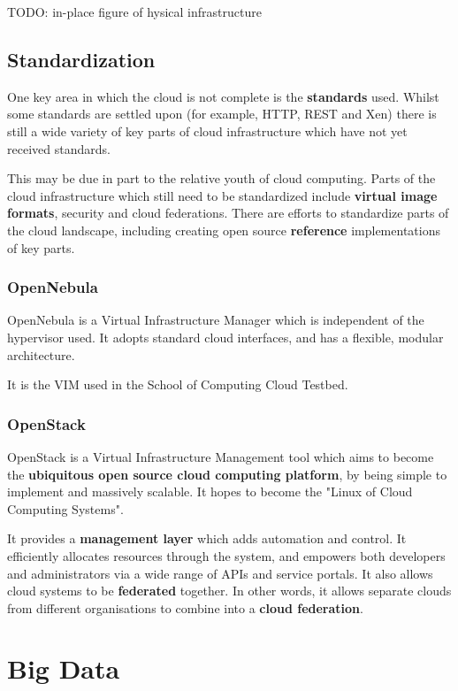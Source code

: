\documentclass{article}
\begin{document}
TODO: in-place figure of hysical infrastructure

\subsection{Standardization}

One key area in which the cloud is not complete is the \textbf{standards} used. Whilst some standards are settled upon (for example, HTTP, REST and Xen) there is still a wide variety of key parts of cloud infrastructure which have not yet received standards.

This may be due in part to the relative youth of cloud computing. Parts of the cloud infrastructure which still need to be standardized include \textbf{virtual image formats}, security and cloud federations. There are efforts to standardize parts of the cloud landscape, including creating open source \textbf{reference} implementations of key parts.
 
\subsubsection{OpenNebula}

OpenNebula is a Virtual Infrastructure Manager which is independent of the hypervisor used. It adopts standard cloud interfaces, and has a flexible, modular architecture. 

It is the VIM used in the School of Computing Cloud Testbed.

\subsubsection{OpenStack}

OpenStack is a Virtual Infrastructure Management tool which aims to become the \textbf{ubiquitous open source cloud computing platform}, by being simple to implement and massively scalable. It hopes to become the "Linux of Cloud Computing Systems". 

It provides a \textbf{management layer} which adds automation and control. It efficiently allocates resources through the system, and empowers both developers and administrators via a wide range of APIs and service portals. It also allows cloud systems to be \textbf{federated} together. In other words, it allows separate clouds from different organisations to combine into a \textbf{cloud federation}.



\section{Big Data}
\end{document}
